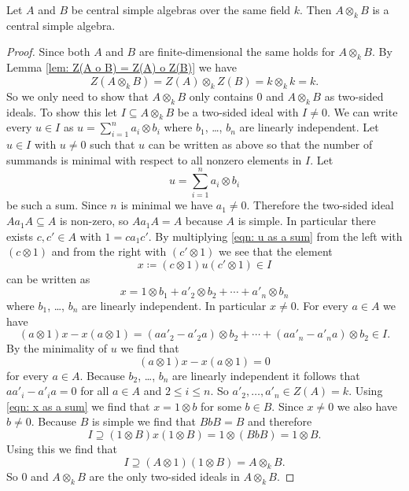 \begin{prop}
  Let $A$ and $B$ be central simple algebras over the same field $k$. Then $A \otimes_k B$ is a central simple algebra.
\end{prop}
\begin{proof}
  Since both $A$ and $B$ are finite-dimensional the same holds for $A \otimes_k B$. By Lemma \ref{lem: Z(A o B) = Z(A) o Z(B)} we have
  \[
    Z(A \otimes_k B) = Z(A) \otimes_k Z(B) = k \otimes_k k = k.
  \]
  So we only need to show that $A \otimes_k B$ only contains $0$ and $A \otimes_k B$ as two-sided ideals. To show this let $I \subseteq A \otimes_k B$ be a two-sided ideal with $I \neq 0$. We can write every $u \in I$ as $u = \sum_{i=1}^n a_i \otimes b_i$ where $b_1$, \dots, $b_n$ are linearly independent. Let $u \in I$ with $u \neq 0$ such that $u$ can be written as above so that the number of summands is minimal with respect to all nonzero elements in $I$. Let
  \begin{equation}\label{eqn: u as a sum}
    u = \sum_{i=1}^n a_i \otimes b_i
  \end{equation}
  be such a sum. Since $n$ is minimal we have $a_1 \neq 0$. Therefore the two-sided ideal $A a_1 A \subseteq A$ is non-zero, so $A a_1 A = A$ because $A$ is simple. In particular there exists $c, c' \in A$ with $1 = c a_1 c'$. By multiplying \eqref{eqn: u as a sum} from the left with $(c \otimes 1)$ and from the right with $(c' \otimes 1)$ we see that the element
  \[
    x \coloneqq (c \otimes 1) u (c' \otimes 1) \in I
  \]
  can be written as
  \begin{equation}\label{eqn: x as a sum}
    x = 1 \otimes b_1 + a'_2 \otimes b_2 + \dotsb + a'_n \otimes b_n
  \end{equation}
  where $b_1$, \dots, $b_n$ are linearly independent. In particular $x \neq 0$. For every $a \in A$ we have
  \[
    (a \otimes 1) x - x (a \otimes 1)
    = (a a'_2 - a'_2 a) \otimes b_2 + \dotsb + (a a'_n - a'_n a) \otimes b_2 \in I.
  \]
  By the minimality of $u$ we find that
  \[
    (a \otimes 1) x - x (a \otimes 1) = 0
  \]
  for every $a \in A$. Because $b_2$, \dots, $b_n$ are linearly independent it follows that $a a'_i - a'_i a = 0$ for all $a \in A$ and $2 \leq i \leq n$. So $a'_2, \dotsc, a'_n \in Z(A) = k$. Using \eqref{eqn: x as a sum} we find that $x = 1 \otimes b$ for some $b \in B$. Since $x \neq 0$ we also have $b \neq 0$. Because $B$ is simple we find that $BbB = B$ and therefore
  \[
    I \supseteq (1 \otimes B) x (1 \otimes B) = 1 \otimes (BbB) = 1 \otimes B.
  \]
  Using this we find that
  \[
    I \supseteq (A \otimes 1) (1 \otimes B) = A \otimes_k B.
  \]
  So $0$ and $A \otimes_k B$ are the only two-sided ideals in $A \otimes_k B$.
\end{proof}





